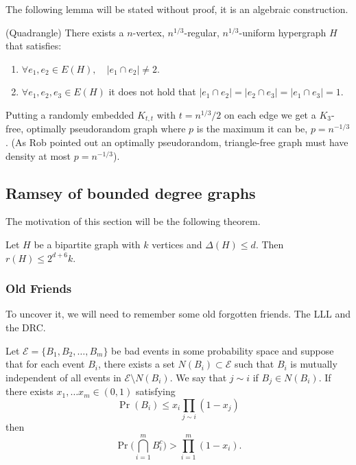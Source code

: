 The following lemma will be stated without proof, it is an algebraic
construction.
\begin{lemma}
	(Quadrangle) There exists a $n$-vertex, $n^{1/3}$-regular,
	$n^{1/3}$-uniform hypergraph $H$ that satisfies:
	\begin{enumerate}[label=(\roman*)]
		\item $\forall e_1, e_2 \in E(H), \quad |e_1 \cap e_2| \neq 2$.
		\item $\forall e_1,e_2,e_3 \in E(H)$ it does not hold that $|e_1
			\cap e_2| = |e_2 \cap e_3| = |e_1 \cap e_3| = 1$.
	\end{enumerate}
\end{lemma}

Putting a randomly embedded $K_{t,t}$ with $t = n^{1/3}/2$ on each
edge we get a $K_3$-free, optimally pseudorandom graph
where $p$ is the maximum it can be, $p = n^{-1/3}$.
(As Rob pointed out an optimally pseudorandom, triangle-free graph
	must have density
at most $p = n^{-1/3}$).

\subsection{Ramsey of bounded degree graphs}

The motivation of this section will be the following theorem.
\begin{theorem}
	\label{trm:ramsey_bipartite_bounded_degree}
	Let $H$ be a bipartite graph with $k$ vertices and $\Delta(H) \leq d$. Then
	$r(H) \leq 2^{d + 6} k$.
\end{theorem}

\subsubsection{Old Friends}
To uncover it, we will need to remember some old forgotten friends.
The LLL and the DRC.

\begin{theorem}
	\label{trm:lll}
	Let $\mathcal{E} = \{B_1, B_2, \dots, B_m\}$ be bad events in some
	probability space and suppose that for each event $B_i$,
	there exists a set $N(B_i) \subset \mathcal{E}$ such that $B_i$ is
	mutually independent of all events in $\mathcal{E} \setminus N(B_i)$.
	We say that $j \sim i$ if $B_j \in N(B_i)$. If there exists $x_1,
	\dots x_m \in (0,1)$ satisfying
	\[
		\Pr(B_i) \leq x_i \prod_{j \sim i}(1-x_j)
	\]
	then
	\[
		\Pr\bigg(\bigcap_{i = 1}^m B_i^c\bigg) > \prod_{i=1}^m (1 - x_i).
	\]
\end{theorem}

